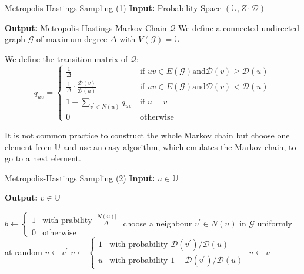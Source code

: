 \documentclass{panikzettel}
\begin{document}
\begin{algo}{Metropolis-Hastings Sampling (1)}
\textbf{Input:} Probability Space $(\mathbb{U}, Z \cdot \mathcal{D})$

\textbf{Output:} Metropolis-Hastings Markov Chain $\mathcal{Q}$
\tcblower
We define a connected undirected graph $\mathcal{G}$ of maximum degree $\Delta$ with $V(\mathcal{G}) = \mathbb{U}$

We define the transition matrix of $\mathcal{Q}$:
$$
q_{uv} =
\begin{cases}
\frac{1}{\Delta} & \text{if } uv \in E(\mathcal{G}) \text{and} \mathcal{D}(v) \geq \mathcal{D}(u) \\
\frac{1}{\Delta} \cdot \frac{\mathcal{D}(v)}{\mathcal{D}(u)} & \text{if } uv \in E(\mathcal{G}) \text{and} \mathcal{D}(v) < \mathcal{D}(u) \\
1 - \sum_{v^\prime \in N(u)} q_{uv^\prime} & \text{if } u = v \\
0 & \text{otherwise}
\end{cases}
$$
\end{algo}

It is not common practice to construct the whole Markov chain but choose one element from $\mathbb{U}$ and use an easy algorithm, which emulates the Markov chain, to go to a next element.

\begin{algo}{Metropolis-Hastings Sampling (2)}
\textbf{Input:} $u \in \mathbb{U}$

\textbf{Output:} $v \in \mathbb{U}$
\tcblower
\begin{algorithmic}[1]
\State $b \leftarrow \begin{cases}1 & \text{with prability } \frac{|N(u)|}{\Delta} \\ 0 & \text{otherwise} \end{cases}$
  \State choose a neighbour $v^\prime \in N(u)$ in $\mathcal{G}$ uniformly at random
    \State $v \leftarrow v^\prime$
  \Else
    \State $v \leftarrow \begin{cases}1 & \text{with probability } \mathcal{D}(v^\prime) / \mathcal{D}(u) \\ u & \text{with probability } 1 - \mathcal{D}(v^\prime) / \mathcal{D}(u) \end{cases}$
  \EndIf
\Else
  \State $v \leftarrow u$
\EndIf
\State {}
\end{algorithmic}
\end{algo}
\end{document}
